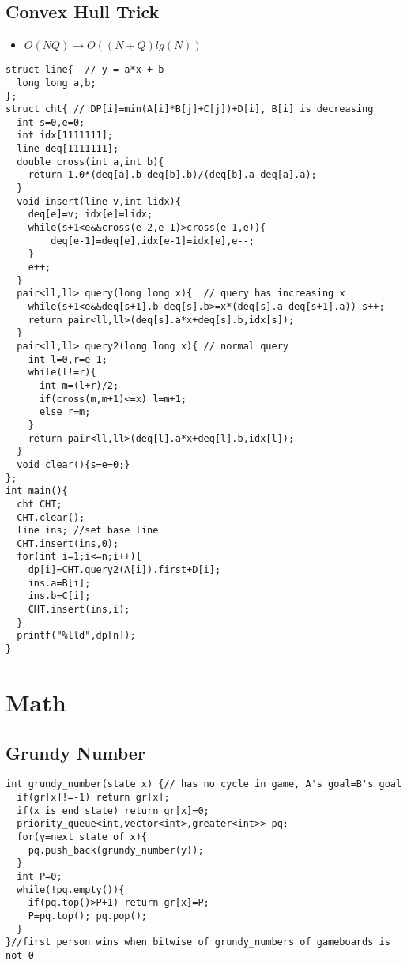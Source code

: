 \documentclass[landscape, 8pt, a4paper, oneside, twocolumn]{extarticle}
\begin{document}
\subsection{Convex Hull Trick}
\begin{itemize}
    \item $O ( N Q ) \to O( (N + Q ) lg ( N ) )$
\end{itemize}
\begin{verbatim}
struct line{  // y = a*x + b
  long long a,b;
};
struct cht{ // DP[i]=min(A[i]*B[j]+C[j])+D[i], B[i] is decreasing
  int s=0,e=0;
  int idx[1111111];
  line deq[1111111];
  double cross(int a,int b){
    return 1.0*(deq[a].b-deq[b].b)/(deq[b].a-deq[a].a);
  }
  void insert(line v,int lidx){
    deq[e]=v; idx[e]=lidx;
    while(s+1<e&&cross(e-2,e-1)>cross(e-1,e)){
        deq[e-1]=deq[e],idx[e-1]=idx[e],e--;
    }
    e++;
  }
  pair<ll,ll> query(long long x){  // query has increasing x
    while(s+1<e&&deq[s+1].b-deq[s].b>=x*(deq[s].a-deq[s+1].a)) s++;
    return pair<ll,ll>(deq[s].a*x+deq[s].b,idx[s]);
  }
  pair<ll,ll> query2(long long x){ // normal query
    int l=0,r=e-1;
    while(l!=r){
      int m=(l+r)/2;
      if(cross(m,m+1)<=x) l=m+1;
      else r=m;
    }
    return pair<ll,ll>(deq[l].a*x+deq[l].b,idx[l]);
  }
  void clear(){s=e=0;}
};
int main(){
  cht CHT;
  CHT.clear();
  line ins; //set base line
  CHT.insert(ins,0);
  for(int i=1;i<=n;i++){
    dp[i]=CHT.query2(A[i]).first+D[i];
    ins.a=B[i];
    ins.b=C[i];
    CHT.insert(ins,i);
  } 
  printf("%lld",dp[n]);
}
\end{verbatim}

\section{Math}

\subsection{Grundy Number}
\begin{verbatim}
int grundy_number(state x) {// has no cycle in game, A's goal=B's goal
  if(gr[x]!=-1) return gr[x];
  if(x is end_state) return gr[x]=0;
  priority_queue<int,vector<int>,greater<int>> pq;
  for(y=next state of x){
    pq.push_back(grundy_number(y));
  }
  int P=0;
  while(!pq.empty()){
    if(pq.top()>P+1) return gr[x]=P;
    P=pq.top(); pq.pop();
  }
}//first person wins when bitwise of grundy_numbers of gameboards is not 0
\end{verbatim}
\end{document}
